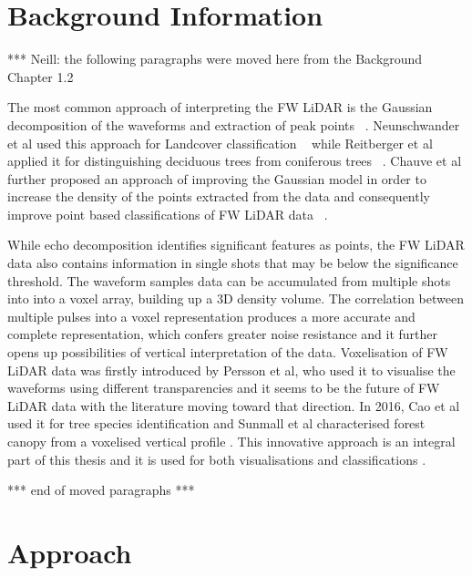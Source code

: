 \documentclass{subfiles}
\begin{document}
\section{Background Information}
	\par {\color{red} *** Neill: the following paragraphs were moved here from the Background Chapter 1.2}
		
	\par The most common approach of interpreting the FW LiDAR is the Gaussian decomposition of the waveforms and extraction of peak points ~\cite{Wanger2006}. Neunschwander et al used this approach for Landcover classification ~\cite{Neuenschwander2009} while Reitberger et al applied it for distinguishing deciduous trees from coniferous trees ~\cite{Reitberger2008}. Chauve et al further proposed an approach of improving the Gaussian model in order to increase the density of the points extracted from the data and consequently improve point based classifications of FW LiDAR data ~\cite{Chauve2007}. 


	\par While echo decomposition identifies significant features as points, the FW LiDAR data also contains information in single shots that may be below the significance threshold. The waveform samples data can be accumulated from multiple shots into {\color{blue} into a voxel array, building up a 3D density volume. The correlation between multiple pulses into a voxel representation produces a more accurate and complete representation, which confers greater noise resistance and it further opens up possibilities of vertical interpretation of the data.} Voxelisation {\color{blue} of FW LiDAR data} was firstly introduced by Persson et al, who used it to visualise the waveforms using different transparencies \cite{Persson2005} and it seems to be the future of FW LiDAR data with the literature moving toward that direction. In 2016, Cao et al used it for tree species identification \cite{Cao2016} and Sunmall et al characterised forest canopy from a voxelised vertical profile \cite{Sumnall2016}. This innovative approach is an integral part of this thesis and it is used for both visualisations and classifications \cite{Miltiadou2014}\cite{Miltiadou2015}. 

	\par {\color{red} *** end of moved paragraphs *** }
		
		

	
\section{Approach}
\end{document}
